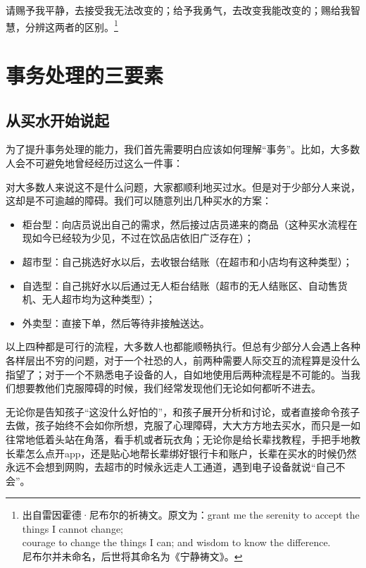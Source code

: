 \begin{savequote}[400pt]
    \fontsize{8pt}{8pt}
    请赐予我平静，去接受我无法改变的；给予我勇气，去改变我能改变的；赐给我智慧，分辨这两者的区别。\footnote{出自雷因霍德·尼布尔的祈祷文。原文为：grant me the serenity to accept the things I cannot change; \\\indent courage to change the things I can; and wisdom to know the difference. \\\indent 尼布尔并未命名，后世将其命名为《宁静祷文》。}
\end{savequote}
\chapter{事务处理的三要素}
\section{从买水开始说起}

为了提升事务处理的能力，我们首先需要明白应该如何理解“事务”。比如，大多数人会不可避免地曾经经历过这么一件事：

对大多数人来说这不是什么问题，大家都顺利地买过水。但是对于少部分人来说，这却是不可逾越的障碍。我们可以随意列出几种买水的方案：
\begin{itemize}
\item 柜台型：向店员说出自己的需求，然后接过店员递来的商品（这种买水流程在现如今已经较为少见，不过在饮品店依旧广泛存在）；
\item 超市型：自己挑选好水以后，去收银台结账（在超市和小店均有这种类型）；
\item 自选型：自己挑好水以后通过无人柜台结账（超市的无人结账区、自动售货机、无人超市均为这种类型）；
\item 外卖型：直接下单，然后等待非接触送达。
\end{itemize}
以上四种都是可行的流程，大多数人也都能顺畅执行。但总有少部分人会遇上各种各样层出不穷的问题，对于一个社恐的人，前两种需要人际交互的流程算是没什么指望了；对于一个不熟悉电子设备的人，自如地使用后两种流程是不可能的。当我们想要教他们克服障碍的时候，我们经常发现他们无论如何都听不进去。

无论你是告知孩子“这没什么好怕的”，和孩子展开分析和讨论，或者直接命令孩子去做，孩子始终不会如你所想，克服了心理障碍，大大方方地去买水，而只是一如往常地低着头站在角落，看手机或者玩衣角；无论你是给长辈找教程，手把手地教长辈怎么点开app，还是贴心地帮长辈绑好银行卡和账户，长辈在买水的时候仍然永远不会想到网购，去超市的时候永远走人工通道，遇到电子设备就说“自己不会”。

